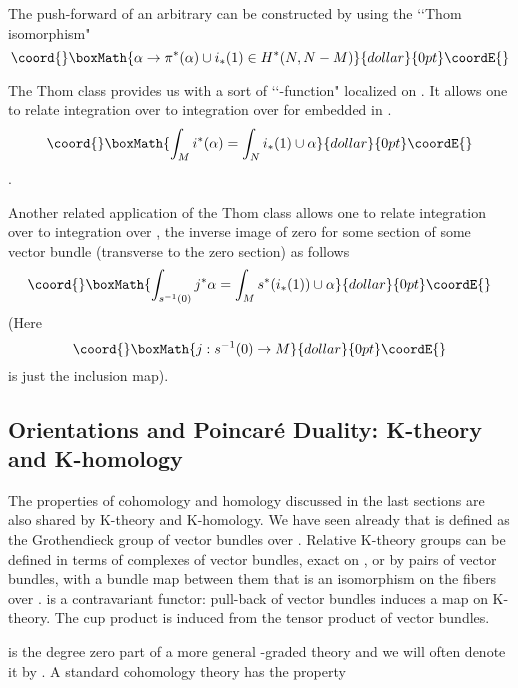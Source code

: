 \documentclass[a4paper,a4paper]{article}
\theoremstyle{conjecture}
\begin{document}
\begin{itemize}
The push-forward \coordHE{}of an arbitrary \coordHE{} can be constructed by using
the \lq\lq Thom isomorphism"
$$\coord{}\boxMath{\alpha\rightarrow \pi^*(\alpha)\cup i_*(1) \in H^*(N,N-M)}{dollar}{0pt}\coordE{}$$
\end{itemize}


The Thom
class \coordHE{} provides us with a sort of \lq\lq \myHighlight{$\delta$}\coordHE{}-function" localized on \coordHE{}.
It allows one to relate integration over \coordHE{} to integration over \coordHE{} for \coordHE{} embedded in \coordHE{}.
$$\coord{}\boxMath{\int_M i^*(\alpha)=\int_N i_*(1)\cup \alpha}{dollar}{0pt}\coordE{}$$.  

Another related application of the Thom class allows one to relate integration over \coordHE{} to
integration over \coordHE{}, the inverse image of zero for some section \coordHE{} of some vector 
bundle \coordHE{} (transverse to the zero section) as follows
$$\coord{}\boxMath{\int_{s^{-1}(0)}j^*\alpha=\int_M s^*(i_*(1))\cup \alpha}{dollar}{0pt}\coordE{}$$
(Here $$\coord{}\boxMath{j:s^{-1}(0)\rightarrow M}{dollar}{0pt}\coordE{}$$
is just the inclusion map).

\subsection{Orientations and Poincar\'e Duality: K-theory and K-homology}

The properties of cohomology and homology discussed in the last sections
are also shared by K-theory and K-homology.  We have seen already that
\coordHE{} is defined as the Grothendieck group of vector bundles over \coordHE{}. Relative
K-theory groups \coordHE{} can be defined in terms of complexes of vector bundles,
exact on \coordHE{}, or by pairs of vector bundles, with a bundle map between them that
is an isomorphism on the fibers over \coordHE{}. \coordHE{} is a contravariant functor: 
pull-back of vector bundles induces a map \coordHE{} on K-theory.
The cup product is induced from the tensor product of
vector bundles.

\coordHE{} is the degree zero part of a more general \coordHE{}-graded theory
\coordHE{} and we will often denote it by \coordHE{}.  
A standard cohomology theory has the property
\end{document}
